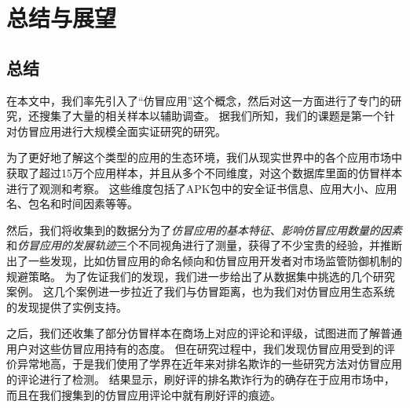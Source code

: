 \chapter{总结与展望}
\label{chp:future}

\section{总结}
在本文中，我们率先引入了``仿冒应用''这个概念，然后对这一方面进行了专门的研究，还搜集了大量的相关样本以辅助调查。
据我们所知，我们的课题是第一个针对仿冒应用进行大规模全面实证研究的研究。

为了更好地了解这个类型的应用的生态环境，我们从现实世界中的各个应用市场中获取了超过15万个应用样本，并且从多个不同维度，对这个数据库里面的仿冒样本进行了观测和考察。
这些维度包括了APK包中的安全证书信息、应用大小、应用名、包名和时间因素等等。

然后，我们将收集到的数据分为了\emph{仿冒应用的基本特征}、\emph{影响仿冒应用数量的因素}和\emph{仿冒应用的发展轨迹}三个不同视角进行了测量，获得了不少宝贵的经验，并推断出了一些发现，比如仿冒应用的命名倾向和仿冒应用开发者对市场监管防御机制的规避策略。
为了佐证我们的发现，我们进一步给出了从数据集中挑选的几个研究案例。
这几个案例进一步拉近了我们与仿冒距离，也为我们对仿冒应用生态系统的发现提供了实例支持。

之后，我们还收集了部分仿冒样本在商场上对应的评论和评级，试图进而了解普通用户对这些仿冒应用持有的态度。
但在研究过程中，我们发现仿冒应用受到的评价异常地高，于是我们使用了学界在近年来对排名欺诈的一些研究方法对仿冒应用的评论进行了检测。
结果显示，刷好评的排名欺诈行为的确存在于应用市场中，而且在我们搜集到的仿冒应用评论中就有刷好评的痕迹。

